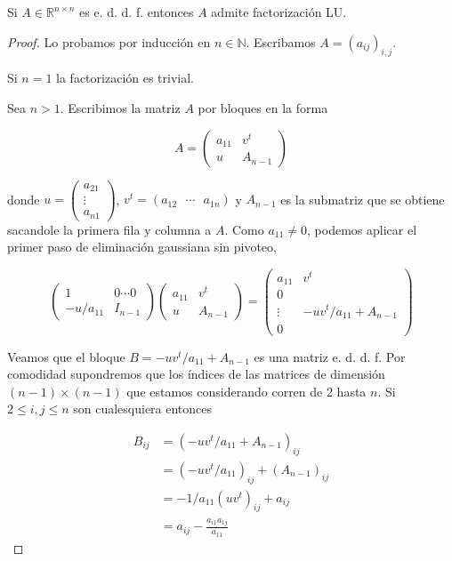 \begin{propo}
Si $A \in \mathbb{R}^{n \times n}$ es e. d. d. f. entonces $A$ admite factorización LU.

\begin{proof}
Lo probamos por inducción en $n \in \mathbb{N}$. Escribamos $A = (a_{ij})_{i, j}$.

Si $n = 1$ la factorización es trivial.

Sea $n > 1$. Escribimos la matriz $A$ por bloques en la forma

\[A = \left(\begin{array}{c|c}
a_{11} & v^t\\ \hline
u & A_{n - 1}
\end{array}\right)\]

donde $u = \begin{pmatrix}a_{21} \\ \vdots \\ a_{n1} \end{pmatrix}$, $v^t = (a_{12} \text{ } \cdots \text{ } a_{1n})$ y $A_{n - 1}$ es la submatriz que se obtiene sacandole la primera fila y columna a $A$. Como $a_{11} \neq 0$, podemos aplicar el primer paso de eliminación gaussiana sin pivoteo,

\[\left(\begin{array}{c|c}
1 & 0 \cdots 0\\ \hline
-u / a_{11} & I_{n - 1} 
\end{array}\right)
\left(\begin{array}{c|c}
a_{11} & v^t\\ \hline
u & A_{n - 1}
\end{array}\right) =
\left(\begin{array}{c|c}
a_{11} & v^t\\ \hline
0 & \\
\vdots & -uv^t / a_{11} + A_{n - 1}\\
0 & 
\end{array}\right)\]

Veamos que el bloque $B = -uv^t / a_{11} + A_{n - 1}$ es una matriz e. d. d. f. Por comodidad supondremos que los índices de las matrices de dimensión $(n - 1) \times (n - 1)$ que estamos considerando corren de 2 hasta $n$. Si $2 \leq i, j \leq n$ son cualesquiera entonces

\begin{align*}
B_{ij} & = (-uv^t / a_{11} + A_{n - 1})_{ij} \\
& = (-uv^t / a_{11})_{ij} + (A_{n - 1})_{ij}\\
& = -1 / a_{11} (uv^t)_{ij} + a_{ij}\\
& = a_{ij} - \frac{a_{i1}a_{1j}}{a_{11}}
\end{align*}


\end{proof}
\end{propo}
